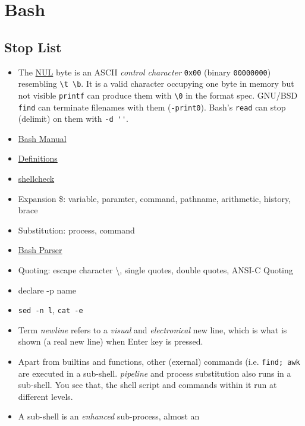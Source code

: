 \chapter{Bash}
\label{cha:bash}

\lstset{language=bash}

\section{Stop List}
\label{sec:bash-stop-list}

\begin{itemize}
\item The \uline{NUL} byte is an ASCII \textit{control character}
  \lstinline|0x00| (binary \lstinline|00000000|) resembling
  \lstinline|\t \b|. It is a valid character occupying one byte in
  memory but not visible \lstinline|printf| can produce them with
  \lstinline|\0| in the format spec. GNU/BSD \lstinline|find| can
  terminate filenames with them (\lstinline|-print0|). Bash's
  \lstinline|read| can stop (delimit) on them with
  \lstinline|-d ''|.
\item 
  \href{https://www.gnu.org/software/bash/manual/bash.html}{Bash
    Manual}
\item
  \href{https://www.gnu.org/software/bash/manual/bash.html#Definitions}{Definitions}
\item \href{https://github.com/koalaman/shellcheck}{shellcheck}
\item Expansion \$: variable, paramter, command, pathname,
  arithmetic, history, brace
\item Substitution: process, command
\item \href{http://mywiki.wooledge.org/BashParser}{Bash Parser}
\item Quoting: escape character \textbackslash{}, single quotes,
  double quotes, ANSI-C Quoting
\item declare -p name
\item \verb|sed -n l|, \verb|cat -e|
\item Term \textit{newline} refers to a \textit{visual} and
  \textit{electronical} new line, which is what is shown (a real
  new line) when Enter key is pressed.
\item Apart from builtins and functions, other (exernal) commands
  (i.e. \lstinline|find; awk| are executed in a
  sub-shell. \textit{pipeline} and process substitution
  also runs in a sub-shell. You see that, the shell script and
  commands within it run at different levels.
\item A sub-shell is an \textit{enhanced} sub-process, almost an

\end{itemize}
